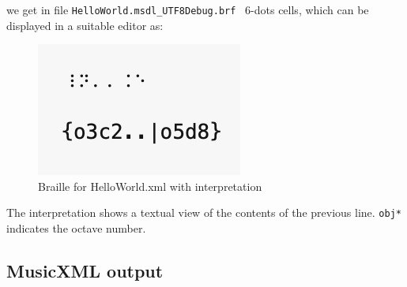 we get in file {\tt HelloWorld.msdl_UTF8Debug.brf} \braille\ 6-dots cells, which can be displayed in a suitable editor as:
\begin{figure}[htbp]
\begin{center}
\includegraphics{../mfgraphics/mfgraphicsBrailleForHelloWorld.xmlWithInterpretation.png}

\caption{Braille for HelloWorld.xml with interpretation}
\label{Braille for HelloWorld.xml with interpretation}
\end{center}
\end{figure}

The interpretation shows a textual view of the contents of the previous line. {\tt obj*} indicates the octave number.

\subsection{MusicXML output}

